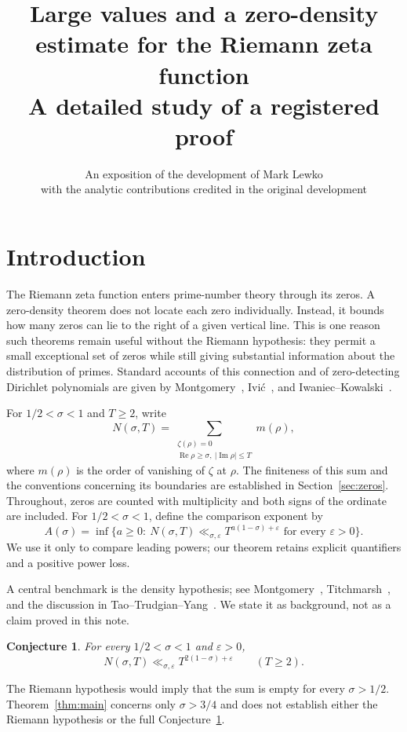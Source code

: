 \documentclass[11pt,a4paper]{article}
\title{Large values and a zero-density estimate for the Riemann zeta function\\[4pt]
\large A detailed study of a registered proof}
\author{An exposition of the development of Mark Lewko\\
\small with the analytic contributions credited in the original development}
\date{}
\numberwithin{equation}{section}
\newtheorem{conjecture}[theorem]{Conjecture}
\theoremstyle{definition}
\newcommand{\Rea}{\operatorname{Re}}
\newcommand{\Ima}{\operatorname{Im}}
\begin{document}
\maketitle

\section{Introduction}\label{sec:contract}
The Riemann zeta function enters prime-number theory through its zeros.
A zero-density theorem does not locate each zero individually. Instead, it
bounds how many zeros can lie to the right of a given vertical line. This is
one reason such theorems remain useful without the Riemann hypothesis:
they permit a small exceptional set of zeros while still giving substantial
information about the distribution of primes. Standard accounts of this
connection and of zero-detecting Dirichlet polynomials are given by
Montgomery~\cite{montgomery}, Ivi\'c~\cite{ivic}, and
Iwaniec--Kowalski~\cite{ik}.

For $1/2<\sigma<1$ and $T\ge2$, write
\[
 N(\sigma,T)=\sum_{\substack{\zeta(\rho)=0\\
                \Rea\rho\ge\sigma,\ |\Ima\rho|\le T}}m(\rho),
\]
where $m(\rho)$ is the order of vanishing of $\zeta$ at $\rho$.
The finiteness of this sum and the conventions concerning its boundaries
are established in Section~\ref{sec:zeros}. Throughout, zeros are counted
with multiplicity and both signs of the ordinate are included.
For $1/2<\sigma<1$, define the comparison exponent by
\[
 A(\sigma)=\inf\{a\ge0:\ N(\sigma,T)\ll_{\sigma,\varepsilon}
          T^{a(1-\sigma)+\varepsilon}\text{ for every }\varepsilon>0\}.
\]
We use it only to compare leading powers; our theorem retains explicit
quantifiers and a positive power loss.

A central benchmark is the density hypothesis; see
Montgomery~\cite{montgomery}, Titchmarsh~\cite{titchmarsh}, and the discussion
in Tao--Trudgian--Yang~\cite{tty}. We state it as background, not as a claim
proved in this note.
\begin{conjecture}\label{conj:density}
For every $1/2<\sigma<1$ and $\varepsilon>0$,
\[
 N(\sigma,T)\ll_{\sigma,\varepsilon}T^{2(1-\sigma)+\varepsilon}
 \qquad(T\ge2).
\]
\end{conjecture}
The Riemann hypothesis would imply that the sum is empty for every
$\sigma>1/2$. Theorem~\ref{thm:main} concerns only $\sigma>3/4$ and does
not establish either the Riemann hypothesis or the full
Conjecture~\ref{conj:density}.
\end{document}
